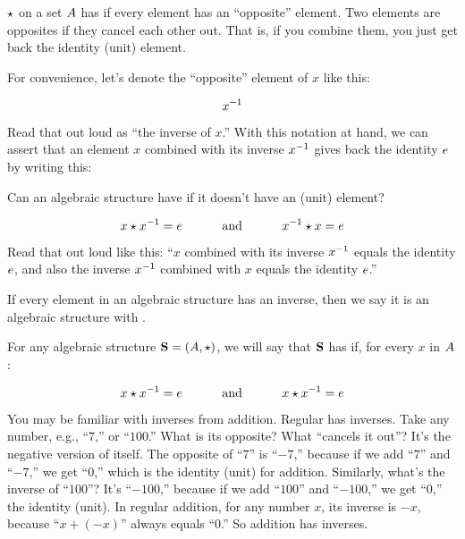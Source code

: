 \documentclass[../../../main.tex]{subfiles}
\begin{document}
 $\opSymbol/$ on a set $A$ has  if every element has an ``opposite'' element. Two elements are opposites if they cancel each other out. That is, if you combine them, you just get back the identity (unit) element.

For convenience, let's denote the ``opposite'' element of $x$ like this:

\begin{equation*}
  x^{-1}
\end{equation*}

Read that out loud as ``the inverse of $x$.'' With this notation at hand, we can assert that an element $x$ combined with its inverse $x^{-1}$ gives back the identity $\unitEl/$ by writing this:

\begin{ponder}
  Can an algebraic structure have  if it doesn't have an  (unit) element?
\end{ponder}

\begin{equation*}
  \op{x}{\inverseEl{x}} = \unitEl/ 
  \hskip 1cm \text{ and } \hskip 1cm
  \op{\inverseEl{x}}{x} = \unitEl/  
\end{equation*}

Read that out loud like this: ``$x$ combined with its inverse $x^{-1}$ equals the identity $\unitEl/$, and also the inverse $x^{-1}$ combined with $x$ equals the identity $\unitEl/$.'' 

If every element in an algebraic structure has an inverse, then we say it is an algebraic structure with .

\begin{fdefinition}
  \label{def:algebra-with-inverses}
  For any algebraic structure $\algebra{S} = (\set{A}, \opSymbol/)$, we will say that $\mathbf{S}$ has  if, for every $x$ in $A$:
  
  \begin{equation*}
    \op{x}{\inverseEl{x}} = \unitEl/ \hskip 1cm \text{ and } \hskip 1cm \op{x}{\inverseEl{x}} = \unitEl/
  \end{equation*}
\end{fdefinition}

\begin{aside}
  \begin{remark}
    You may be familiar with inverses from addition. Regular  has inverses. Take any number, e.g., ``$7$,'' or ``$100$.'' What is its opposite? What ``cancels it out''? It's the negative version of itself. The opposite of ``$7$'' is ``$-7$,'' because if we add ``$7$'' and ``$-7$,'' we get ``$0$,'' which is the identity (unit) for addition. Similarly, what's the inverse of ``$100$''? It's ``$-100$,'' because if we add ``$100$'' and ``$-100$,'' we get ``$0$,'' the identity (unit). In regular addition, for any number $x$, its inverse is $-x$, because ``$x + (-x)$'' always equals ``$0$.'' So addition has inverses.
  \end{remark}
\end{aside}
\end{document}
